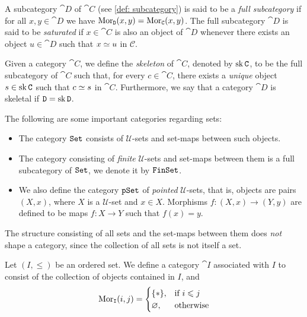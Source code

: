 \begin{definition}\label{def: full subcategory}
A subcategory \(\cat D\) of \(\cat C\) (see \cref{def: subcategory}) is said to
be a \emph{full subcategory} if for all \(x, y \in \cat D\) we have
\(\operatorname{Mor}_{\texttt D}(x, y) = \operatorname{Mor}_{\texttt C}(x, y)\). The full subcategory \(\cat D\)
is said to be \emph{saturated} if \(x \in \cat C\) is also an object of \(\cat D\)
whenever there exists an object \(u \in \cat D\) such that \(x \simeq u\) in
\(\mathcal C\).
\end{definition}

\begin{definition}[Skeleton]
\label{def:skeleton-category}
Given a category \(\cat C\), we define the \emph{skeleton} of \(\cat C\),
denoted by \(\operatorname{sk} \texttt C\), to be the full subcategory of \(\cat C\) such that,
for every \(c \in \cat C\), there exists a \emph{unique} object
\(s \in \operatorname{sk} \texttt C\) such that \(c \simeq s\) in \(\cat C\). Furthermore, we say
that a category \(\cat D\) is skeletal if \(\texttt D = \operatorname{sk} \texttt D\).
\end{definition}

\begin{example}
\label{exp:set-based-categories}
The following are some important categories regarding sets:
\begin{itemize}\setlength\itemsep{0em}
\item The category \({\texttt{Set}}\) consists of \(\mathcal U\)-sets and set-maps between
  such objects.
\item The category consisting of \emph{finite} \(\mathcal U\)-sets and set-maps
  between them is a full subcategory of \({\texttt{Set}}\), we denote it by \({\texttt{FinSet}}\).
\item We also define the category \({\texttt{pSet}}\) of \emph{pointed} \(\mathcal
  U\)-sets, that is, objects are pairs \((X, x)\), where \(X\) is a \(\mathcal
  U\)-set and \(x \in X\). Morphisms \(f: (X, x) \to (Y, y)\) are defined to be
  maps \(f: X \to Y\) such that \(f(x) = y\).
\end{itemize}
\end{example}

\begin{remark}
The structure consisting of all sets and the set-maps between them does
\emph{not} shape a category, since the collection of all sets is not itself a
set.
\end{remark}

\begin{example}
\label{exp:order-category}
Let \((I, \leq)\) be an ordered set. We define a category \(\cat I\)
associated with \(I\) to consist of the collection of objects contained in
\(I\), and
\[
  \operatorname{Mor}_{\texttt I}(i, j) =
  \begin{cases}
    \{*\}, &\text{if } i \leqslant j \\
    \varnothing, &\text{otherwise}
  \end{cases}
\]
\end{example}

